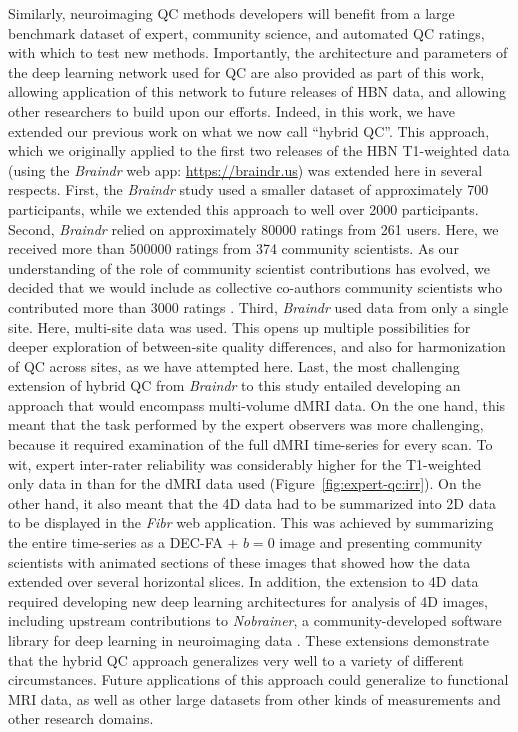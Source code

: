 \documentclass[9pt,lineno]{elife}
\begin{document}
Similarly, neuroimaging QC methods developers will benefit from a large
benchmark dataset of expert, community science, and automated QC ratings, with
which to test new methods. Importantly, the architecture and parameters of the
deep learning network used for QC are also provided as part of this work,
allowing application of this network to future releases of HBN data, and
allowing other researchers to build upon our efforts. Indeed, in this work, we
have extended our previous work on what we now call ``hybrid QC''. This
approach, which we originally applied to the first two releases of the HBN
T1-weighted data \citep{keshavan2019-er} (using the \emph{Braindr} web app:
\url{https://braindr.us}) was extended here in several respects.
First, the \emph{Braindr} study used a smaller dataset of approximately 700
participants, while we extended this approach to well over \num{2000} participants.
Second, \emph{Braindr} relied on approximately \num{80000} ratings from
\num{261} users. Here, we received more than \num{500000} ratings from
\num{374} community scientists. As our understanding of the role of
community scientist contributions has evolved, we decided that we would
include as collective co-authors community scientists who contributed more
than \num{3000} ratings \citep{Ward-Fear2020-zq}.
Third, \emph{Braindr} used data from only a single site. Here, multi-site
data was used. This opens up multiple possibilities for deeper exploration of
between-site quality differences, and also for harmonization of QC across
sites, as we have attempted here.
Last, the most challenging extension of hybrid QC from \emph{Braindr} to
this study entailed developing an approach that would encompass multi-volume
dMRI data. On the one hand, this meant that the task performed by the expert
observers was more challenging, because it required examination of the full
dMRI time-series for every scan. To wit, expert inter-rater reliability was
considerably higher for the T1-weighted only data in \cite{keshavan2019-er}
than for the dMRI data used (Figure~\ref{fig:expert-qc:irr}).
On the other hand, it also meant that the 4D data had to be summarized into
2D data to be displayed in the \emph{Fibr} web application. This was
achieved by summarizing the entire time-series as a DEC-FA + $b=0$ image and
presenting community scientists with animated sections of these images that
showed how the data extended over several horizontal slices.
In addition, the extension to 4D data required developing new deep learning
architectures for analysis of 4D images, including upstream contributions to
\emph{Nobrainer}, a community-developed software library for deep learning
in neuroimaging data \citep{nobrainer}.
These extensions demonstrate that the hybrid QC approach generalizes very well
to a variety of different circumstances. Future applications of this approach
could generalize to functional MRI data, as well as other large datasets from
other kinds of measurements and other research domains.
\end{document}
